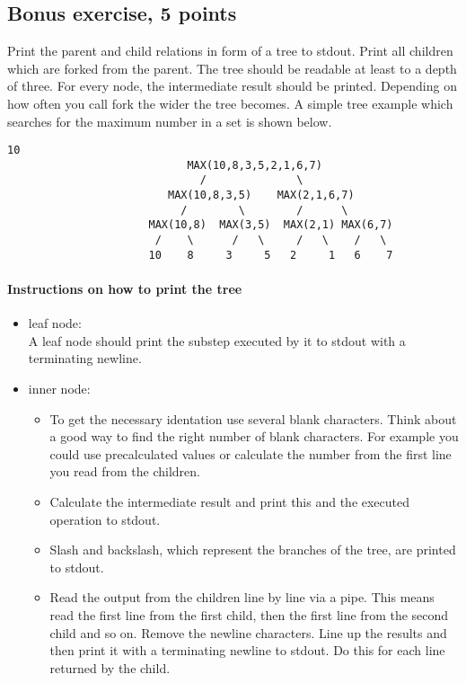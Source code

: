 \newpage
\subsection*{Bonus exercise, 5 points}
Print the parent and child relations in form of a tree to stdout. Print all children which are forked from the parent.
The tree should be readable at least to a depth of three.
For every node, the intermediate result should be printed.\newline
Depending on how often you call fork the wider the tree becomes. A simple tree example which searches for the maximum number in a set is shown below.

\begin{verbatim}
10
                            MAX(10,8,3,5,2,1,6,7)
                              /              \		
                         MAX(10,8,3,5)    MAX(2,1,6,7)
                           /        \        /      \
                      MAX(10,8)  MAX(3,5)  MAX(2,1) MAX(6,7)
                       /    \      /   \     /   \    /   \
                      10    8     3     5   2     1   6    7 
\end{verbatim}
\paragraph{Instructions on how to print the tree}
\begin{itemize}
	\item leaf node: \\
	A leaf node should print the substep executed by it to stdout with a terminating newline.
	\item inner node: 
	\begin{itemize}
		\item To get the necessary identation use several blank characters. Think about a good way to find the right number of blank characters. For example you could use precalculated values or calculate the number from the first line you read from the children.
		\item Calculate the intermediate result and print this and the executed operation to stdout.
		\item Slash and backslash, which represent the branches of the tree, are printed to stdout.
		\item Read the output from the children line by line via a pipe. This means read the first line from the first child, then the first line from the second child and so on. Remove the newline characters. Line up the results and then print it with a terminating newline to stdout. Do this for each line returned by the child.
	\end{itemize}
\end{itemize}